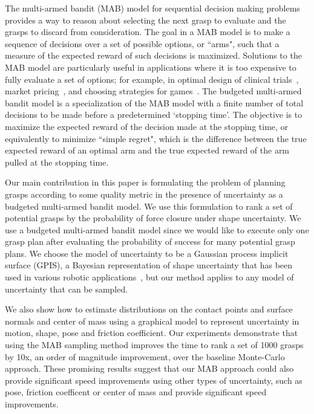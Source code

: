 \documentclass[letterpaper, 10 pt, conference]{ieeeconf}  %
\begin{document}
The multi-armed bandit (MAB) model for sequential decision making problems \cite{barto1998reinforcement, lai1985asymptotically, robbins1952some} provides a way to reason about selecting the next grasp to evaluate and the grasps to discard from consideration.
The goal in a MAB model is to make a sequence of decisions over a set of possible options, or ``arms", such that a measure of the expected reward of such decisions is maximized.
Solutions to the MAB model are particularly useful in applications where it is too expensive to fully evaluate a set of options; for example, in optimal design of clinical trials~\cite{simon1989optimal}, market pricing~\cite{rothschild1974two}, and choosing strategies for games~\cite{st2012online}.
The budgeted multi-armed bandit model \cite{madani2004budgeted} is a specialization of the MAB model with a finite number of total decisions to be made before a predetermined `stopping time'.
The objective is to maximize the expected reward of the decision made at the stopping time, or equivalently to minimize ``simple regret", which is the difference between the true expected reward of an optimal arm and the true expected reward of the arm pulled at the stopping time.

Our main contribution in this paper is formulating the problem of planning grasps according to some quality metric in the presence of uncertainty as a budgeted multi-armed bandit model.
We use this formulation to rank a set of potential grasps by the probability of force closure \cite{christopoulos2007handling, kehoe2012toward} under shape uncertainty.
We use a budgeted multi-armed bandit model since we would like to execute only one grasp plan after evaluating the probability of success for many potential grasp plans.
We choose the model of uncertainty to be a Gaussian process implicit surface (GPIS), a Bayesian representation of shape uncertainty that has been used in various robotic applications~\cite{dragiev2011, hollinger2013}, but our method applies to any model of uncertainty that can be sampled.

We also show how to estimate distributions on the contact points and surface normals and center of mass using a graphical model to represent uncertainty in motion, shape, pose and friction coefficient. Our experiments demonstrate that using the MAB sampling method improves the time to rank a set of 1000 grasps by 10x, an order of magnitude improvement, over the baseline Monte-Carlo approach. These promising results suggest that our MAB approach could also provide  significant speed improvements using other types of uncertainty, such as pose, friction coefficent or center of mass and provide significant speed improvements. 
\end{document}
